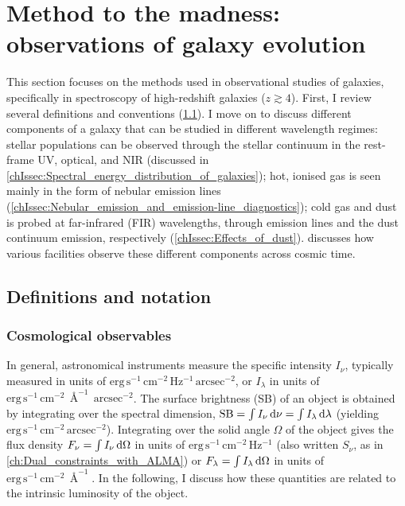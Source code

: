 \section{Method to the madness: observations of galaxy evolution}
\label{chIsec:Observational_methods}

This section focuses on the methods used in observational studies of galaxies, specifically in spectroscopy of high-redshift galaxies ($z \gtrsim 4$). First, I review several definitions and conventions (\cref{chIssec:Definitions_and_notation}). I move on to discuss different components of a galaxy that can be studied in different wavelength regimes: stellar populations can be observed through the stellar continuum in the rest-frame UV, optical, and NIR (discussed in \cref{chIssec:Spectral_energy_distribution_of_galaxies}); hot, ionised gas is seen mainly in the form of nebular emission lines (\cref{chIssec:Nebular_emission_and_emission-line_diagnostics}); cold gas and dust is probed at far-infrared (FIR) wavelengths, through emission lines and the dust continuum emission, respectively (\cref{chIssec:Effects_of_dust}).  discusses how various facilities observe these different components across cosmic time.

\subsection{Definitions and notation}
\label{chIssec:Definitions_and_notation}

\subsubsection{Cosmological observables}
\label{chIsssec:Cosmological_observables}

In general, astronomical instruments measure the specific intensity $I_\nu$, typically measured in units of $\mathrm{erg \, s^{-1} \, cm^{-2} \, Hz^{-1} \, arcsec^{-2}}$, or $I_\lambda$ in units of $\mathrm{erg \, s^{-1} \, cm^{-2} \, \Angstrom^{-1} \, arcsec^{-2}}$. The surface brightness (SB) of an object is obtained by integrating over the spectral dimension, $\text{SB} = \int I_\nu \dif \nu = \int I_\lambda \dif \lambda$ (yielding $\mathrm{erg \, s^{-1} \, cm^{-2} \, arcsec^{-2}}$). Integrating over the solid angle $\Omega$ of the object gives the flux density $F_\nu = \int I_\nu \dif \Omega$ in units of $\mathrm{erg \, s^{-1} \, cm^{-2} \, Hz^{-1}}$ (also written $S_\nu$, as in \cref{ch:Dual_constraints_with_ALMA}) or $F_\lambda = \int I_\lambda \dif \Omega$ in units of $\mathrm{erg \, s^{-1} \, cm^{-2} \, \Angstrom^{-1}}$. In the following, I discuss how these quantities are related to the intrinsic luminosity of the object.

